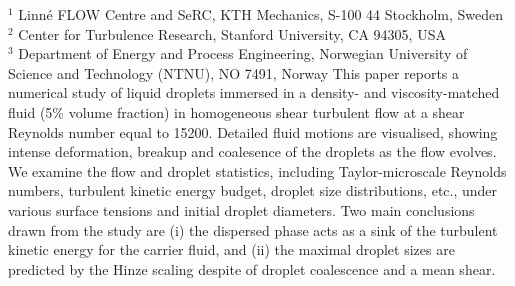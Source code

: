 %
%
%
%
%
%
%
\paperaffiliation
{%
  $^1$ Linn\'e FLOW Centre and SeRC, KTH Mechanics, S-100 44 Stockholm, Sweden\\%
  $^2$ Center for Turbulence Research, Stanford University, CA 94305, USA\\%
  $^3$ Department of Energy and Process Engineering, Norwegian University of Science and Technology (NTNU), NO 7491, Norway%
}%
%
%
%
%
%
\papernumber{}%
%
%
%
%
%
\papersummary%
{%
   This paper reports a numerical study of liquid droplets immersed in a density- and viscosity-matched fluid (5\% volume fraction)
   in homogeneous shear turbulent flow at a shear Reynolds number equal to 15200.
   Detailed fluid motions are visualised, showing intense deformation, breakup and coalesence of the droplets as the flow evolves.
   We examine the flow and droplet statistics, including Taylor-microscale Reynolds numbers, turbulent kinetic energy budget, droplet size distributions, etc.,
   under various surface tensions and initial droplet diameters.
   Two main conclusions drawn from the study are (i) the dispersed phase acts as a sink of the turbulent kinetic energy for the carrier fluid, and
   (ii) the maximal droplet sizes are predicted by the Hinze scaling despite of droplet coalescence and a mean shear.
}%
%
\graphicspath{{paper5/}}%
%
%
%
